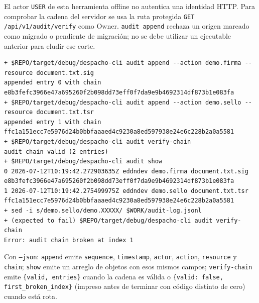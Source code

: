 El actor \texttt{USER} de esta herramienta offline no autentica una identidad
HTTP. Para comprobar la cadena del servidor se usa la ruta protegida
\texttt{GET /api/v1/audit/verify} como Owner. \texttt{audit append} rechaza
un origen marcado como migrado o pendiente de migración; no se debe utilizar
un ejecutable anterior para eludir ese corte.

\begin{lstlisting}[numbers=none]
+ $REPO/target/debug/despacho-cli audit append --action demo.firma --resource document.txt.sig
appended entry 0 with chain e8b3fefc3966e47a695260f2b098dd73eff0f7da9e9b4692314df873b1e083fa
+ $REPO/target/debug/despacho-cli audit append --action demo.sello --resource document.txt.tsr
appended entry 1 with chain ffc1a151ecc7e5976d24b0bbfaaaed4c9230a8ed597938e24e6c228b2a0a5581
+ $REPO/target/debug/despacho-cli audit verify-chain
audit chain valid (2 entries)
+ $REPO/target/debug/despacho-cli audit show
0 2026-07-12T10:19:42.272903635Z eddndev demo.firma document.txt.sig e8b3fefc3966e47a695260f2b098dd73eff0f7da9e9b4692314df873b1e083fa
1 2026-07-12T10:19:42.275499975Z eddndev demo.sello document.txt.tsr ffc1a151ecc7e5976d24b0bbfaaaed4c9230a8ed597938e24e6c228b2a0a5581
+ sed -i s/demo.sello/demo.XXXXX/ $WORK/audit-log.jsonl
+ (expected to fail) $REPO/target/debug/despacho-cli audit verify-chain
Error: audit chain broken at index 1
\end{lstlisting}

Con \texttt{--json}: \texttt{append} emite \texttt{sequence}, \texttt{timestamp}, \texttt{actor}, \texttt{action}, \texttt{resource} y \texttt{chain}; \texttt{show} emite un arreglo de objetos con esos mismos campos; \texttt{verify-chain} emite \texttt{\{valid, entries\}} cuando la cadena es válida o \texttt{\{valid: false, first\_broken\_index\}} (impreso antes de terminar con código distinto de cero) cuando está rota.
